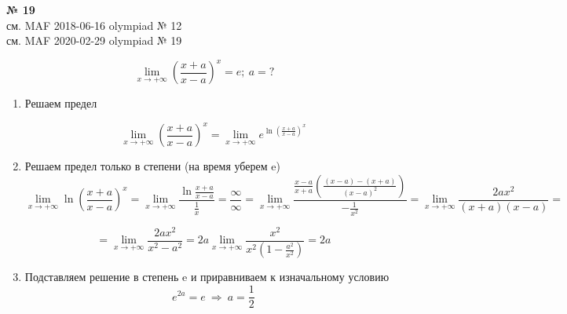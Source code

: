 \documentclass{article}
\begin{document}
\textbf{№ 19} 
\large
\\
см. MAF 2018-06-16 olympiad № 12 \\
см. MAF 2020-02-29 olympiad № 19

$$ \lim\limits_{x \to +\infty} \left( \frac{x+a}{x-a} \right)^x = e; \ a = ? $$  

\begin{enumerate}
\item Решаем предел

$$ \lim\limits_{x \to +\infty} \left( \frac{x+a}{x-a} \right)^x
= \lim\limits_{x \to +\infty} e^{\ln{\left( \frac{x+a}{x-a} \right)^x}} $$

\item Решаем предел только в степени (на время уберем e)
$$ \lim\limits_{x \to +\infty} \ln{\left( \frac{x+a}{x-a} \right)^x} 
= \lim\limits_{x \to +\infty} \frac{\ln{\frac{x+a}{x-a}}}{\frac{1}{x}}  
= \frac{\infty}{\infty}
= \lim\limits_{x \to +\infty} \frac{ \frac{x-a}{x+a} \left( \frac{(x-a)-(x+a)}{(x-a)^2} \right) }{-\frac{1}{x^2}} 
= \lim\limits_{x \to +\infty} \frac{2ax^2}{(x+a)(x-a)} 
= $$

$$ = \lim\limits_{x \to +\infty} \frac{2ax^2}{x^2-a^2}  
= 2a \lim\limits_{x \to +\infty} \frac{x^2}{x^2 \left(1 - \frac{a^2}{x^2} \right)} 
= 2a $$

\item Подставляем решение в степень e и приравниваем к изначальному условию
$$ e^{2a} = e \ \Rightarrow \ a = \frac{1}{2} $$

\end{enumerate}
\end{document}
